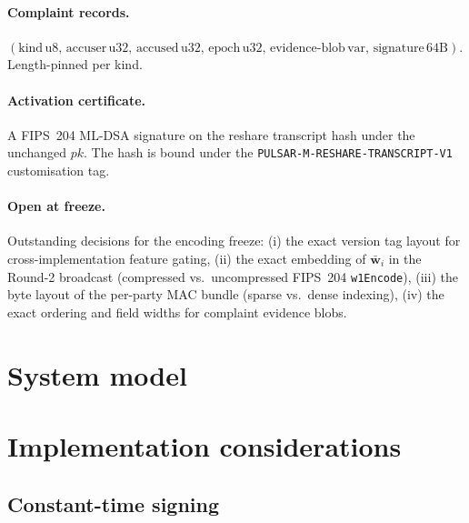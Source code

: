 \documentclass[11pt,a4paper]{article}
\theoremstyle{definition}
\theoremstyle{remark}
\begin{document}
\paragraph{Complaint records.}
$(\text{kind}\,\text{u8},\,\text{accuser}\,\text{u32},\,\text{accused}\,\text{u32},\,\text{epoch}\,\text{u32},\,\text{evidence-blob}\,\text{var},\,\text{signature}\,\text{64B})$.
Length-pinned per kind.

\paragraph{Activation certificate.}
A FIPS~204 ML-DSA signature on the reshare transcript hash under the
unchanged $\mathit{pk}$. The hash is bound under the
\texttt{PULSAR-M-RESHARE-TRANSCRIPT-V1} customisation tag.

\paragraph{Open at freeze.}
Outstanding decisions for the encoding freeze:
(i) the exact version tag layout for cross-implementation feature
gating,
(ii) the exact embedding of $\bar{\mathbf{w}}_i$ in the Round-2
broadcast (compressed vs.\ uncompressed FIPS~204
\texttt{w1Encode}),
(iii) the byte layout of the per-party MAC bundle (sparse vs.\
dense indexing),
(iv) the exact ordering and field widths for complaint evidence blobs.

\section{System model}
\label{sec:system-model}



\section{Implementation considerations}
\label{sec:impl}

\subsection{Constant-time signing}
\label{sec:impl-ct}
\end{document}
